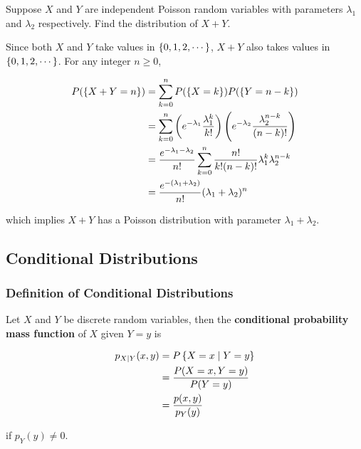 \documentclass[a4paper,12pt]{article}
\begin{document}
\begin{exm}
  Suppose $X$ and $Y$ are independent Poisson random variables with parameters $\lambda_{1}$ and $\lambda_{2}$ respectively. Find the distribution of $X+Y$.\n

  \ans Since both $X$ and $Y$ take values in $\left\{ 0,1,2,\cdots\right\}$, $X+Y$ also takes values in $\left\{ 0,1,2,\cdots\right\}$. For any integer $n\geq 0$,

  $$\begin{aligned}[t]
    P(\left\{ X+Y=n\right\})&=\sum_{k=0}^{n}P(\left\{ X=k\right\})P(\left\{ Y=n-k\right\})\\
    &=\sum_{k=0}^{n}\left( e^{-\lambda_{1}}\frac{\lambda_{1}^{k}}{k!}\right)\left( e^{-\lambda_{2}}\frac{\lambda_{2}^{n-k}}{(n-k)!}\right)\\
    &=\frac{e^{-\lambda_{1}-\lambda_{2}}}{n!}\sum_{k=0}^{n}\frac{n!}{k!(n-k)!}\lambda_{1}^{k}\lambda_{2}^{n-k}\\
    &=\frac{e^{-(\lambda_{1}+\lambda_{2})}}{n!}(\lambda_{1}+\lambda_{2})^{n}
  \end{aligned}$$\s

  which implies $X+Y$ has a Poisson distribution with parameter $\lambda_{1}+\lambda_{2}$.
\end{exm}

\subsection{Conditional Distributions}
\subsubsection{Definition of Conditional Distributions}
\begin{dft}
  Let $X$ and $Y$ be discrete random variables, then the \textbf{conditional probability mass function} of $X$ given $Y=y$ is

  $$\begin{aligned}[t]
    p_{X|Y}(x,y)&=P\left\{ X=x\mid Y=y\right\}\\
    &=\frac{P(X=x,Y=y)}{P(Y=y)}\\
    &=\frac{p(x,y)}{p_{Y}(y)}
  \end{aligned}$$\s

  if $p_{Y}(y)\neq 0$.
\end{dft}\n
\end{document}
